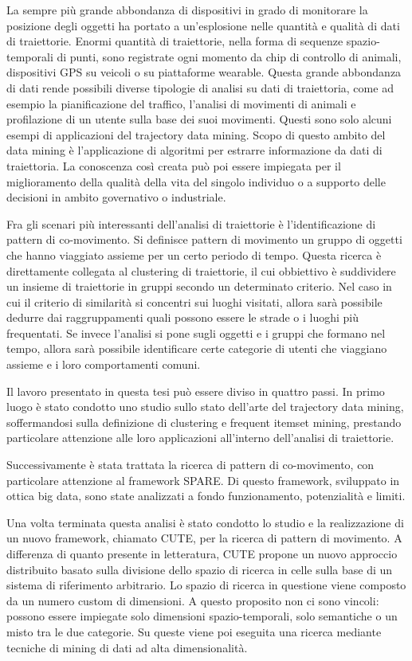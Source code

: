 La sempre più grande abbondanza di dispositivi in grado di monitorare la posizione degli oggetti ha portato a un'esplosione nelle quantità e qualità di dati di traiettorie.
Enormi quantità di traiettorie, nella forma di sequenze spazio-temporali di punti, sono registrate ogni momento da chip di controllo di animali, dispositivi GPS su veicoli o su
piattaforme wearable. 
Questa grande abbondanza di dati rende possibili diverse tipologie di analisi su dati di traiettoria, come ad esempio la pianificazione del traffico, l'analisi di movimenti di animali e profilazione di un utente sulla base dei suoi movimenti.
Questi sono solo alcuni esempi di applicazioni del trajectory data mining.
Scopo di questo ambito del data mining è l'applicazione di algoritmi per estrarre informazione da dati di traiettoria.
La conoscenza così creata può poi essere impiegata per il miglioramento della qualità della vita del singolo individuo o a supporto delle decisioni in ambito governativo o industriale.

Fra gli scenari più interessanti dell'analisi di traiettorie è l'identificazione di pattern di co-movimento.
Si definisce pattern di movimento un gruppo di oggetti che hanno viaggiato assieme per un certo periodo di tempo.
Questa ricerca è direttamente collegata al clustering di traiettorie, il cui obbiettivo è suddividere un insieme di traiettorie in gruppi secondo un determinato criterio.
Nel caso in cui il criterio di similarità si concentri sui luoghi visitati, allora sarà possibile dedurre dai raggruppamenti quali possono essere le strade o i luoghi più frequentati.
Se invece l'analisi si pone sugli oggetti e i gruppi che formano nel tempo, allora sarà possibile identificare certe categorie di utenti che viaggiano assieme e i loro comportamenti comuni.

Il lavoro presentato in questa tesi può essere diviso in quattro passi.
In primo luogo è stato condotto uno studio sullo stato dell'arte del trajectory data mining, soffermandosi sulla definizione di clustering e frequent itemset mining, prestando particolare attenzione alle loro applicazioni all'interno dell'analisi di traiettorie.

Successivamente è stata trattata la ricerca di pattern di co-movimento, con particolare attenzione al framework SPARE.
Di questo framework, sviluppato in ottica big data, sono state analizzati a fondo funzionamento, potenzialità e limiti.

Una volta terminata questa analisi è stato condotto lo studio e la realizzazione di un nuovo framework, chiamato CUTE, per la ricerca di pattern di movimento.
A differenza di quanto presente in letteratura, CUTE propone un nuovo approccio distribuito basato sulla divisione dello spazio di ricerca in celle sulla base di un sistema di riferimento arbitrario.
Lo spazio di ricerca in questione viene composto da un numero custom di dimensioni.
A questo proposito non ci sono vincoli: possono essere impiegate solo dimensioni spazio-temporali, solo semantiche o un misto tra le due categorie.
Su queste viene poi eseguita una ricerca mediante tecniche di mining di dati ad alta dimensionalità.

